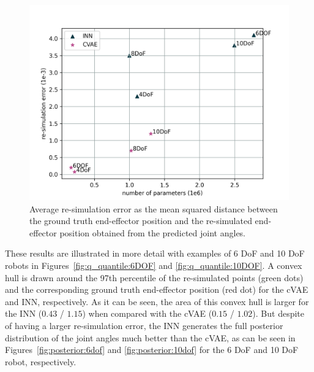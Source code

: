 \documentclass[conference]{IEEEtran}
\begin{document}
\begin{figure}[t]
\centering
	\includegraphics[width=\linewidth]{figures/comparison_e_resim_alternative.png}
    \caption{\label{fig:plot:resim} Average re-simulation error as the mean squared distance between the ground truth end-effector position and the re-simulated end-effector position obtained from the predicted joint angles.}
\end{figure}

These results are illustrated in more detail with examples of 6 DoF and 10 DoF robots in Figures~\ref{fig:q_quantile:6DOF} and \ref{fig:q_quantile:10DOF}. A convex hull is drawn around the 97th percentile of the re-simulated points (green dots) and the corresponding ground truth end-effector position (red dot) for the cVAE and INN, respectively.  As it can be seen, the area of this convex hull is larger for the INN ($0.43$ / $1.15$) when compared with the cVAE ($0.15$ / $1.02$). But despite of having a larger re-simulation error, the INN generates the full posterior distribution of the joint angles much better than the cVAE, as can be seen in Figures~\ref{fig:posterior:6dof} and \ref{fig:posterior:10dof} for the 6 DoF and 10 DoF robot, respectively. 
\end{document}
